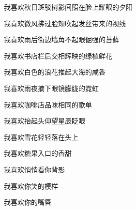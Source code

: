 \large
\begin{flushleft}
    \vspace*{1cm}
    \par \hspace*{0.5cm} \vspace*{5pt}
    我喜欢秋日斑驳树影间照在脸上耀眼的夕阳 \par \hspace*{0.5cm} \vspace*{5pt}
    我喜欢微风拂过脸颊吹起发丝带来的视线 \par \hspace*{0.5cm} \vspace*{5pt}
    我喜欢雨后街边墙角不起眼倔强的苔藓 \par \hspace*{0.5cm} \vspace*{5pt}
    我喜欢书店栏后交相辉映的绿植鲜花 \par \hspace*{0.5cm} \vspace*{5pt}
    我喜欢白色的浪花推起大海的咸香 \par \hspace*{0.5cm} \vspace*{5pt}
    我喜欢雨夜摘下眼镜朦胧的霓虹 \par \hspace*{0.5cm} \vspace*{5pt}
    我喜欢咖啡店品味相同的歌单 \par \hspace*{0.5cm} \vspace*{5pt}
    我喜欢抬起头仰望星辰眨眼 \par \hspace*{0.5cm} \vspace*{5pt}
    我喜欢雪花轻轻落在头上 \par \hspace*{0.5cm} \vspace*{5pt}
    我喜欢糖果入口的香甜 \par \hspace*{0.5cm} \vspace*{5pt}
    我喜欢悄悄看你背影 \par \hspace*{0.5cm} \vspace*{5pt}
    我喜欢你笑的模样 \par \hspace*{0.5cm} \vspace*{5pt}
    我喜欢你的嘴唇 \par \hspace*{0.5cm} \vspace*{5pt}

\end{flushleft}
